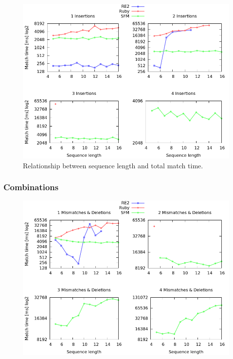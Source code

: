 \documentclass[12pt]{article}
\theoremstyle{definition}
\begin{document}
\begin{figure}[H]
	\begin{center}
		\includegraphics[scale=0.55]{graphs/insertions.png}	
	\end{center}
	\caption{Relationship between sequence length and total match time.}
	\label{graph:cases:insertions}
\end{figure}

\subsubsection{Combinations}

\begin{figure}[H]
	\begin{center}
		\includegraphics[scale=0.55]{graphs/mismatches_deletions.png}	
	\end{center}
	\caption{}
	\label{graph:cases:combinations}
\end{figure}
\end{document}
